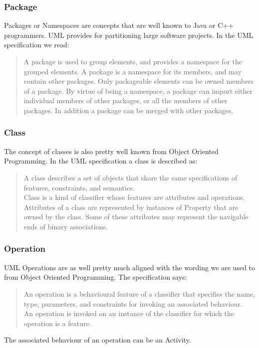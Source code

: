 \subsubsection{Package}
Packages or Namespaces are concepts that are well known to Java or C++ programmers. UML provides  for partitioning large software projects. In the UML specification we read:
\begin{quotation}
A package is used to group elements, and provides a namespace for the grouped elements.
A package is a namespace for its members, and may contain other packages. Only packageable elements can be owned
members of a package. By virtue of being a namespace, a package can import either individual members of other
packages, or all the members of other packages.
In addition a package can be merged with other packages.
\end{quotation}\cite{UML23Superstructure}
\subsubsection{Class}
The concept of classes is also pretty well known from Object Oriented Programming. In the UML specification a class is described as:
\begin{quotation}
A class describes a set of objects that share the same specifications of features, constraints, and semantics.\\
Class is a kind of classifier whose features are attributes and operations. Attributes of a class are represented by instances
of Property that are owned by the class. Some of these attributes may represent the navigable ends of binary associations.
\cite{UML23Superstructure}\end{quotation}
\subsubsection{Operation}
UML Operations are as well pretty much aligned with the wording we are used to from Object Oriented Programming. The specification says:
\begin{quotation}
An operation is a behavioural feature of a classifier that specifies the name, type, parameters, and constraints for invoking
an associated behaviour.\\
An operation is invoked on an instance of the classifier for which the operation is a feature.
\end{quotation}
The associated behaviour of an operation can be an Activity.
